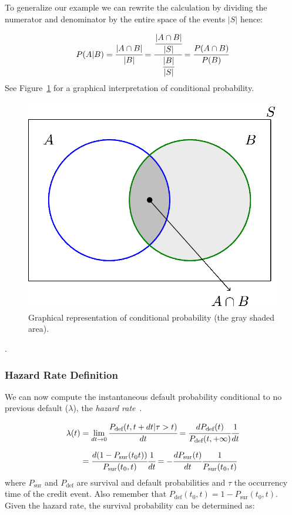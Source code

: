 To generalize our example we can rewrite the calculation by dividing the numerator and denominator by the entire space of the events \(|S|\) hence:

\begin{equation}
P(A|B) = \cfrac{|A\cap B|}{|B|} = \cfrac{\cfrac{|A\cap B|}{|S|}}{\cfrac{|B|}{|S|}} = \cfrac{P(A\cap B)}{P(B)}
\end{equation}
See Figure~\ref{fig:conditional_prob} for a graphical interpretation of conditional probability.

\begin{figure}[tb]
\centering
\includegraphics[width=0.5\linewidth]{figures/conditional_b}
\caption{Graphical representation of conditional probability (the gray shaded area).}
\label{fig:conditional_prob}
\end{figure}
.
\subsubsection{Hazard Rate Definition}
We can now compute the instantaneous default probability conditional to no previous default ($\lambda$), the \emph{hazard rate}~\cite{bib:hazard}.

\begin{equation}
\begin{split}
\lambda(t)& = \lim_{dt\rightarrow 0} \cfrac{P_{\textrm{def}}(t, t+dt|\tau> t)}{dt} = \cfrac{dP_{\textrm{def}}(t)}{P_{\textrm{def}}(t, +\infty)}\cfrac{1}{dt}\\[5 pt] &
= \cfrac{d(1-P_{\textrm{sur}}(t_0 t))}{P_{\textrm{sur}}(t_0, t)}\cfrac{1}{dt} = -\cfrac{dP_{\textrm{sur}}(t)}{dt}\cfrac{1}{P_{\textrm{sur}}(t_0, t)}
\end{split}
\end{equation}
where $P_{\textrm{sur}}$ and $P_{\textrm{def}}$ are survival and default probabilities and $\tau$ the occurrency time of the credit event.
Also remember that $P_{\textrm{def}}(t_0, t) = 1 - P_{\textrm{sur}}(t_0, t)$. Given the hazard rate, the survival probability can be determined as:

